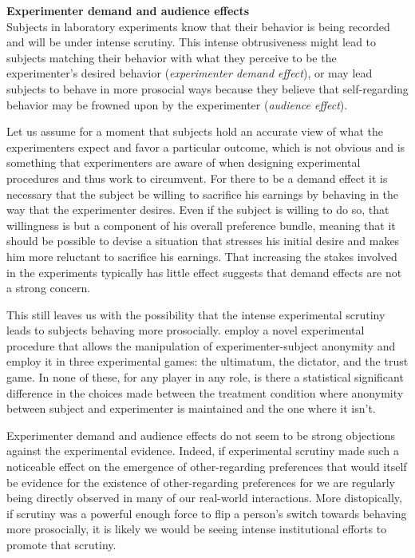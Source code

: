 \documentclass[12pt]{article}
\begin{document}
\textbf{Experimenter demand and audience effects}
\\

Subjects in laboratory experiments know that their behavior is being recorded and will be under intense scrutiny. This intense obtrusiveness might lead to subjects matching their behavior with what they perceive to be the experimenter's desired behavior (\textit{experimenter demand effect}), or may lead subjects to behave in more prosocial ways because they believe that self-regarding behavior may be frowned upon by the experimenter (\textit{audience effect}).

Let us assume for a moment that subjects hold an accurate view of what the experimenters expect and favor a particular outcome, which is not obvious and is something that experimenters are aware of when designing experimental procedures and thus work to circumvent. For there to be a demand effect it is necessary that the subject be willing to sacrifice his earnings by behaving in the way that the experimenter desires. Even if the subject is willing to do so, that willingness is but a component of his overall preference bundle, meaning that it should be possible to devise a situation that stresses his initial desire and makes him more reluctant to sacrifice his earnings. That increasing the stakes involved in the experiments typically has little effect suggests that demand effects are not a strong concern.

This still leaves us with the possibility that the intense experimental scrutiny leads to subjects behaving more prosocially. \cite{barmettler2012big} employ a novel experimental procedure that allows the manipulation of experimenter-subject anonymity and employ it in three experimental games: the ultimatum, the dictator, and the trust game. In none of these, for any player in any role, is there a statistical significant difference in the choices made between the treatment condition where anonymity between subject and experimenter is maintained and the one where it isn't.

Experimenter demand and audience effects do not seem to be strong objections against the experimental evidence. Indeed, if experimental scrutiny made such a noticeable effect on the emergence of other-regarding preferences that would itself be evidence for the existence of other-regarding preferences for we are regularly being directly observed in many of our real-world interactions. More distopically, if scrutiny was a powerful enough force to flip a person's switch towards behaving more prosocially, it is likely we would be seeing intense institutional efforts to promote that scrutiny.
\\
\end{document}
